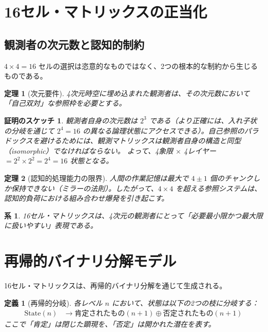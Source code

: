 \documentclass[12pt,a4paper]{ujarticle}
\newtheorem{definition}{定義}[section]
\newtheorem{theorem}{定理}[section]
\newtheorem*{proof_sketch}{証明のスケッチ}
\newtheorem{corollary}{系}[section]
\begin{document}
\section{16セル・マトリックスの正当化}

\subsection{観測者の次元数と認知的制約}

$4 \times 4 = 16$ セルの選択は恣意的なものではなく、2つの根本的な制約から生じるものである。

\begin{theorem}[次元要件]
4次元時空に埋め込まれた観測者は、その次元数において「自己双対」な参照枠を必要とする。
\end{theorem}

\begin{proof_sketch}
観測者自身の次元数は $2^3$ である（より正確には、入れ子状の分岐を通じて $2^4 = 16$ の異なる論理状態にアクセスできる）。自己参照のパラドックスを避けるためには、観測マトリックスは観測者自身の構造と同型（isomorphic）でなければならない。
よって、4象限 $\times$ 4レイヤー $= 2^2 \times 2^2 = 2^4 = 16$ 状態となる。
\end{proof_sketch}

\begin{theorem}[認知的処理能力の限界]
人間の作業記憶は最大で $4 \pm 1$ 個のチャンクしか保持できない（ミラーの法則）。したがって、$4 \times 4$ を超える参照システムは、認知的負荷における組み合わせ爆発を引き起こす。
\end{theorem}

\begin{corollary}
16セル・マトリックスは、4次元の観測者にとって「必要最小限かつ最大限に扱いやすい」表現である。
\end{corollary}

\appendix

\section{再帰的バイナリ分解モデル}

16セル・マトリックスは、再帰的バイナリ分解を通じて生成される。

\begin{definition}[再帰的分岐]
各レベル $n$ において、状態は以下の2つの枝に分岐する：
\begin{align}
\text{State}(n) &\to \text{肯定されたもの}(n+1) \oplus \text{否定されたもの}(n+1)
\end{align}
ここで「肯定」は閉じた顕現を、「否定」は開かれた潜在を表す。
\end{definition}
\end{document}
